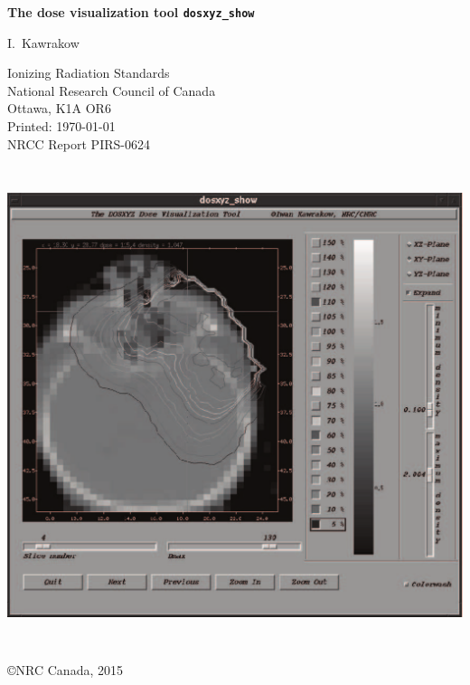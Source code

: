 \documentclass[12pt]{article}
\begin{document}
\pagestyle{empty}

\begin{center}

{\sffamily \bfseries \Huge The dose visualization tool {\tt dosxyz\_show}
\vspace{5mm}\\}
\begin{large}
I.~Kawrakow \\
\end{large}
Ionizing Radiation Standards\\
National Research Council of Canada
\\Ottawa, K1A OR6\\

Printed: \today
\\
\vspace{5mm}
\mbox{}\hfill NRCC Report {\sf PIRS-0624}\\

\vspace{1cm}

\includegraphics[height=14cm,width=16cm]{figures/dosxyz_show}


\vfill
\copyright NRC Canada, 2015
\end{center}
\end{document}
